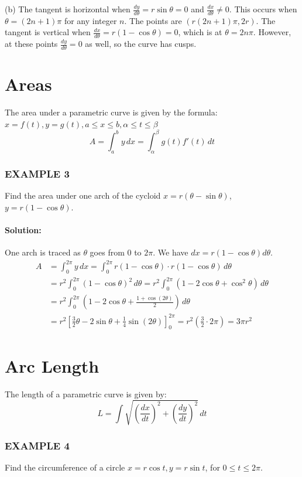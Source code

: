 \documentclass{article}
\begin{document}
(b) The tangent is horizontal when $\frac{dy}{d\theta}=r\sin\theta=0$ and $\frac{dx}{d\theta} \neq 0$. This occurs when $\theta = (2n+1)\pi$ for any integer $n$. The points are $(r(2n+1)\pi, 2r)$. The tangent is vertical when $\frac{dx}{d\theta}=r(1-\cos\theta)=0$, which is at $\theta=2n\pi$. However, at these points $\frac{dy}{d\theta}=0$ as well, so the curve has cusps.

\section*{Areas}
The area under a parametric curve is given by the formula:
\\ $x=f(t), y=g(t), a\leq x\leq b, \alpha \leq t\leq \beta $
\[
A = \int_{a}^{b} y \, dx = \int_{\alpha }^{\beta } g(t)f'(t) \, dt
\]

\subsubsection*{EXAMPLE 3}
Find the area under one arch of the cycloid $x=r(\theta-\sin\theta)$, $y=r(1-\cos\theta)$.

\paragraph{Solution:}
One arch is traced as $\theta$ goes from $0$ to $2\pi$. We have $dx = r(1-\cos\theta)d\theta$.
\begin{align*}
    A &= \int_{0}^{2\pi} y \, dx = \int_{0}^{2\pi} r(1-\cos\theta) \cdot r(1-\cos\theta) \, d\theta \\
    &= r^2 \int_{0}^{2\pi} (1-\cos\theta)^2 \, d\theta = r^2 \int_{0}^{2\pi} (1 - 2\cos\theta + \cos^2\theta) \, d\theta \\
    &= r^2 \int_{0}^{2\pi} \left(1 - 2\cos\theta + \frac{1+\cos(2\theta)}{2}\right) \, d\theta \\
    &= r^2 \left[ \frac{3}{2}\theta - 2\sin\theta + \frac{1}{4}\sin(2\theta) \right]_{0}^{2\pi} = r^2 \left( \frac{3}{2} \cdot 2\pi \right) = 3\pi r^2
\end{align*}

\section*{Arc Length}
The length of a parametric curve is given by:
\[
L = \int \sqrt{\left(\frac{dx}{dt}\right)^2 + \left(\frac{dy}{dt}\right)^2} \, dt
\]

\subsubsection*{EXAMPLE 4}
Find the circumference of a circle $x=r\cos t, y=r\sin t$, for $0 \le t \le 2\pi$.
\end{document}
